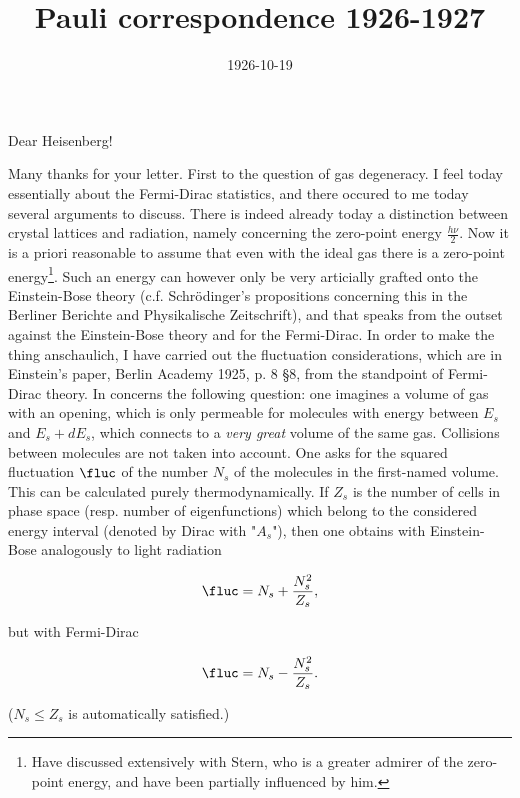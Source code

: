 \documentclass{article}
\title{Pauli correspondence 1926-1927}
\newcommand{\uequ}[1]{
\begin{align*}
#1
\end{align*}
}
\begin{document}
\date{1926-10-19}
Dear Heisenberg!

Many thanks for your letter. First to the question of gas degeneracy. I feel today essentially  about the Fermi-Dirac statistics, and there occured to me today several arguments to discuss. There is indeed already today a distinction between crystal lattices and radiation, namely concerning the zero-point energy $\frac{h\nu}{2}$. Now it is a priori reasonable to assume that even with the ideal gas there is a zero-point energy\footnote{Have discussed extensively with Stern, who is a greater admirer of the zero-point energy, and have been partially influenced by him.}. Such an energy can however only be very articially grafted onto the Einstein-Bose theory (c.f. Schrödinger's propositions concerning this in the Berliner Berichte and Physikalische Zeitschrift), and that speaks from the outset against the Einstein-Bose theory and for the Fermi-Dirac. In order to make the thing anschaulich, I have carried out the fluctuation considerations, which are in Einstein's paper, Berlin Academy 1925, p. 8 §8, from the standpoint of Fermi-Dirac theory. In concerns the following question: one imagines a volume of gas with an opening, which is only permeable for molecules with energy between $E_s$ and $E_s + dE_s$, which connects to a \textit{very great} volume of the same gas. Collisions between molecules are not taken into account. One asks for the squared fluctuation $\fluc$ of the number $N_s$ of the  molecules in the first-named volume. This can be calculated purely thermodynamically. If $Z_s$ is the number of cells in phase space (resp. number of eigenfunctions) which belong to the considered energy interval (denoted by Dirac with "$A_s$"), then one obtains with Einstein-Bose analogously to light radiation
\uequ{
\fluc = N_s + \frac{N_s^2}{Z_s},
}
but with Fermi-Dirac
\uequ{
\fluc = N_s - \frac{N_s^2}{Z_s}.
}
($N_s \leq Z_s$ is automatically satisfied.)
\end{document}
